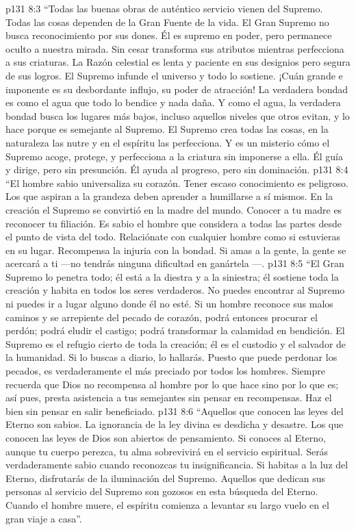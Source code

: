 \vs p131 8:3 “Todas las buenas obras de auténtico servicio vienen del Supremo. Todas las cosas dependen de la Gran Fuente de la vida. El Gran Supremo no busca reconocimiento por sus dones. Él es supremo en poder, pero permanece oculto a nuestra mirada. Sin cesar transforma sus atributos mientras perfecciona a sus criaturas. La Razón celestial es lenta y paciente en sus designios pero segura de sus logros. El Supremo infunde el universo y todo lo sostiene. ¡Cuán grande e imponente es su desbordante influjo, su poder de atracción! La verdadera bondad es como el agua que todo lo bendice y nada daña. Y como el agua, la verdadera bondad busca los lugares más bajos, incluso aquellos niveles que otros evitan, y lo hace porque es semejante al Supremo. El Supremo crea todas las cosas, en la naturaleza las nutre y en el espíritu las perfecciona. Y es un misterio cómo el Supremo acoge, protege, y perfecciona a la criatura sin imponerse a ella. Él guía y dirige, pero sin presunción. Él ayuda al progreso, pero sin dominación.
\vs p131 8:4 “El hombre sabio universaliza su corazón. Tener escaso conocimiento es peligroso. Los que aspiran a la grandeza deben aprender a humillarse a sí mismos. En la creación el Supremo se convirtió en la madre del mundo. Conocer a tu madre es reconocer tu filiación. Es sabio el hombre que considera a todas las partes desde el punto de vista del todo. Relaciónate con cualquier hombre como si estuvieras en su lugar. Recompensa la injuria con la bondad. Si amas a la gente, la gente se acercará a ti ---no tendrás ninguna dificultad en ganártela ---.
\vs p131 8:5 “El Gran Supremo lo penetra todo; él está a la diestra y a la siniestra; él sostiene toda la creación y habita en todos los seres verdaderos. No puedes encontrar al Supremo ni puedes ir a lugar alguno donde él no esté. Si un hombre reconoce sus malos caminos y se arrepiente del pecado de corazón, podrá entonces procurar el perdón; podrá eludir el castigo; podrá transformar la calamidad en bendición. El Supremo es el refugio cierto de toda la creación; él es el custodio y el salvador de la humanidad. Si lo buscas a diario, lo hallarás. Puesto que puede perdonar los pecados, es verdaderamente el más preciado por todos los hombres. Siempre recuerda que Dios no recompensa al hombre por lo que hace sino por lo que es; así pues, presta asistencia a tus semejantes sin pensar en recompensas. Haz el bien sin pensar en salir beneficiado.
\vs p131 8:6 “Aquellos que conocen las leyes del Eterno son sabios. La ignorancia de la ley divina es desdicha y desastre. Los que conocen las leyes de Dios son abiertos de pensamiento. Si conoces al Eterno, aunque tu cuerpo perezca, tu alma sobrevivirá en el servicio espiritual. Serás verdaderamente sabio cuando reconozcas tu insignificancia. Si habitas a la luz del Eterno, disfrutarás de la iluminación del Supremo. Aquellos que dedican sus personas al servicio del Supremo son gozosos en esta búsqueda del Eterno. Cuando el hombre muere, el espíritu comienza a levantar su largo vuelo en el gran viaje a casa”.
